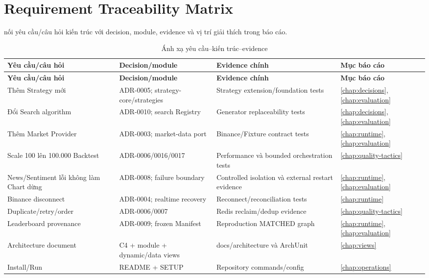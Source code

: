 \documentclass[12pt,a4paper,oneside]{report}
\begin{document}
\chapter{Requirement Traceability Matrix}
\label{app:traceability}

 nối yêu cầu/câu hỏi kiến trúc với decision, module, evidence và vị trí giải thích trong báo cáo.

\begin{longtable}{L{3cm}L{3.7cm}L{3.7cm}L{2.5cm}}
  \caption{Ánh xạ yêu cầu--kiến trúc--evidence}\label{tab:traceability}\\
  \toprule
  \textbf{Yêu cầu/câu hỏi} & \textbf{Decision/module} & \textbf{Evidence chính} & \textbf{Mục báo cáo} \\
  \midrule
  \endfirsthead
  \toprule
  \textbf{Yêu cầu/câu hỏi} & \textbf{Decision/module} & \textbf{Evidence chính} & \textbf{Mục báo cáo} \\
  \midrule
  \endhead
  Thêm Strategy mới & ADR-0005; strategy-core/strategies & Strategy extension/foundation tests & \ref{chap:decisions}, \ref{chap:evaluation} \\
  Đổi Search algorithm & ADR-0010; search Registry & Generator replaceability tests & \ref{chap:decisions}, \ref{chap:evaluation} \\
  Thêm Market Provider & ADR-0003; market-data port & Binance/Fixture contract tests & \ref{chap:runtime}, \ref{chap:evaluation} \\
  Scale 100 lên 100.000 Backtest & ADR-0006/0016/0017 & Performance và bounded orchestration tests & \ref{chap:quality-tactics} \\
  News/Sentiment lỗi không làm Chart dừng & ADR-0008; failure boundary & Controlled isolation và external restart evidence & \ref{chap:runtime}, \ref{chap:evaluation} \\
  Binance disconnect & ADR-0004; realtime recovery & Reconnect/reconciliation tests & \ref{chap:runtime} \\
  Duplicate/retry/order & ADR-0006/0007 & Redis reclaim/dedup evidence & \ref{chap:quality-tactics} \\
  Leaderboard provenance & ADR-0009; frozen Manifest & Reproduction MATCHED graph & \ref{chap:runtime}, \ref{chap:evaluation} \\
  Architecture document & C4 + module + dynamic/data views & docs/architecture và ArchUnit & \ref{chap:views} \\
  Install/Run & README + SETUP & Repository commands/config & \ref{chap:operations} \\
  \bottomrule
\end{longtable}
\end{document}
